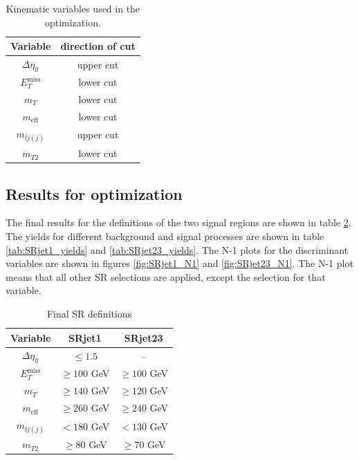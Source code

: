 \begin{table}[htbp]
\centering
\begin{tabular}{|c|c|}
\hline
Variable & direction of cut \\
\hline
\hline
$\Delta \eta_{ll}$ & upper cut \\
\hline
$E_T^{\text{miss}}$ & lower cut \\
\hline
$m_T$ & lower cut \\
\hline
$m_{\text{eff}}$ & lower cut \\
\hline
$m_{lj(j)}$ & upper cut \\
\hline
$m_{T2}$ & lower cut \\
\hline
\end{tabular}
\caption{Kinematic variables used in the optimization.}
\label{tab:variables_optimization}
\end{table}

\subsection{Results for optimization}
The final results for the definitions of the two signal regions are shown in table \ref{tab:SR_Def}.
The yields for different background and signal processes are shown in table \ref{tab:SRjet1_yields} and \ref{tab:SRjet23_yields}.
The N-1 plots for the discriminant variables are shown in figures \ref{fig:SRjet1_N1} and \ref{fig:SRjet23_N1}.
The N-1 plot means that all other SR selections are applied, except the selection for that variable.

\begin{table}[htpb]
\centering
\begin{tabular}{|c|c|c|}
\hline
Variable &  SRjet1 & SRjet23 \\ \hline
$\Delta\eta_{ll}$ & $\leq 1.5$ &  -- \\
$E_T^{\text{miss}}$ &  $\geq 100 $ GeV  & $\geq 100$ GeV\\
$m_T$ & $\geq 140$ GeV & $\geq 120$ GeV \\
$m_{\text{eff}}$ & $\geq 260$ GeV &  $\geq 240$ GeV\\
$m_{lj(j)}$ & $< 180$ GeV &  $< 130$ GeV\\
$m_{T2}$ & $\geq 80$ GeV&  $\geq 70$ GeV \\
\hline
\end{tabular}
\caption{Final SR definitions}
\label{tab:SR_Def}
\end{table}

